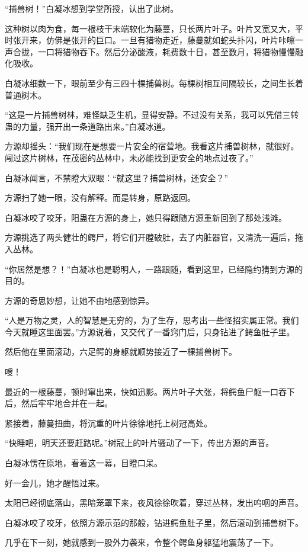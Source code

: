 \begin{this_body}
“捕兽树！”白凝冰想到学堂所授，认出了此树。

这种树以肉为食，每一根枝干末端软化为藤蔓，只长两片叶子。叶片又宽又大，平时张开来，仿佛是张开的巨口。一旦有猎物走近，藤蔓就如蛇头扑闪，叶片咔嚓一声合拢，一口将猎物吞下。然后分泌酸液，耗费数十日，甚至数月，将猎物慢慢融化吸收。

白凝冰细数一下，眼前至少有三四十棵捕兽树。每棵树相互间隔较长，之间生长着普通树木。

“这是一片捕兽树林，难怪缺乏生机，显得安静。不过没有关系，我可以凭借三转蛊的力量，强开出一条道路出来。”白凝冰道。

方源却摇头：“我们现在是想要一片安全的宿营地。我看这片捕兽树林，就很好。闯过这片树林，在茂密的丛林中，未必能找到更安全的地点过夜了。”

白凝冰闻言，不禁瞪大双眼：“就这里？捕兽树林，还安全？”

方源扫了她一眼，没有解释。而是转身，原路返回。

白凝冰咬了咬牙，阳蛊在方源的身上，她只得跟随方源重新回到了那处浅滩。

方源挑选了两头健壮的鳄尸，将它们开膛破肚，去了内脏器官，又清洗一遍后，拖入丛林。

“你居然是想？！”白凝冰也是聪明人，一路跟随，看到这里，已经隐约猜到方源的目的。

方源的奇思妙想，让她不由地感到惊异。

“人是万物之灵，人的智慧是无穷的，为了生存，思考出一些怪招实属正常。我们今天就睡这里面罢。”方源说着，又交代了一番窍门后，只身钻进了鳄鱼肚子里。

然后他在里面滚动，六足鳄的身躯就顺势接近了一棵捕兽树下。

嗖！

最近的一根藤蔓，顿时窜出来，快如迅影。两片叶子大张，将鳄鱼尸躯一口吞下后，然后牢牢地合并在一起。

紧接着，藤蔓扭曲，将沉重的叶片徐徐地托上树冠高处。

“快睡吧，明天还要赶路呢。”树冠上的叶片骚动了一下，传出方源的声音。

白凝冰愣在原地，看着这一幕，目瞪口呆。

好一会儿，她才醒悟过来。

太阳已经彻底落山，黑暗笼罩下来，夜风徐徐吹着，穿过丛林，发出呜咽的声音。

白凝冰咬了咬牙，依照方源示范的那般，钻进鳄鱼肚子里，然后滚动到捕兽树下。

几乎在下一刻，她就感到一股外力袭来，令整个鳄鱼身躯猛地震荡了一下。


\end{this_body}
